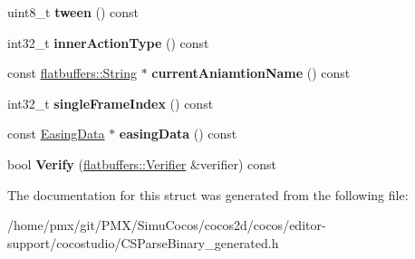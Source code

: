 \begin{DoxyCompactItemize}
\item 
\mbox{\label{structflatbuffers_1_1InnerActionFrame_a9dce8e85c641c1225e3e6c865c0ea0fa}} 
uint8\+\_\+t {\bfseries tween} () const
\item 
\mbox{\label{structflatbuffers_1_1InnerActionFrame_a3bc2cf3b3d1aeaa2f8ef95f2c0a7a369}} 
int32\+\_\+t {\bfseries inner\+Action\+Type} () const
\item 
\mbox{\label{structflatbuffers_1_1InnerActionFrame_aa9d63689b33341379530ea56447b55e7}} 
const \hyperlink{structflatbuffers_1_1String}{flatbuffers\+::\+String} $\ast$ {\bfseries current\+Aniamtion\+Name} () const
\item 
\mbox{\label{structflatbuffers_1_1InnerActionFrame_ab4c5020dcd71c02344f7c33b3cadcc02}} 
int32\+\_\+t {\bfseries single\+Frame\+Index} () const
\item 
\mbox{\label{structflatbuffers_1_1InnerActionFrame_ad4b83c87e0aff4b6ac3ffccad6eaac9f}} 
const \hyperlink{structflatbuffers_1_1EasingData}{Easing\+Data} $\ast$ {\bfseries easing\+Data} () const
\item 
\mbox{\label{structflatbuffers_1_1InnerActionFrame_a1dfeffb4075b7b84af4c4d60247d1b98}} 
bool {\bfseries Verify} (\hyperlink{classflatbuffers_1_1Verifier}{flatbuffers\+::\+Verifier} \&verifier) const
\end{DoxyCompactItemize}


The documentation for this struct was generated from the following file\+:\begin{DoxyCompactItemize}
\item 
/home/pmx/git/\+P\+M\+X/\+Simu\+Cocos/cocos2d/cocos/editor-\/support/cocostudio/C\+S\+Parse\+Binary\+\_\+generated.\+h\end{DoxyCompactItemize}
